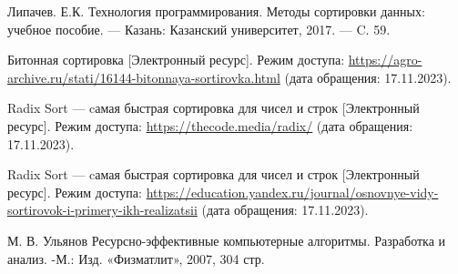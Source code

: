 
\renewcommand\bibname{Список использованных источников}
\begin{thebibliography}{}
	 Липачев. Е.К. Технология программирования. Методы сортировки данных: учебное пособие. — Казань: Казанский университет, 2017. — C. 59.
	
	 Битонная сортировка [Электронный ресурс]. Режим доступа: \url{https://agro-archive.ru/stati/16144-bitonnaya-sortirovka.html} (дата обращения: 17.11.2023).
	
	 Radix Sort  --- cамая быстрая сортировка для чисел и строк [Электронный ресурс]. Режим доступа: \url{https://thecode.media/radix/} (дата обращения: 17.11.2023).
	
	 Radix Sort  --- cамая быстрая сортировка для чисел и строк [Электронный ресурс]. Режим доступа: \url{https://education.yandex.ru/journal/osnovnye-vidy-sortirovok-i-primery-ikh-realizatsii} (дата обращения: 17.11.2023).
	
	  М. В. Ульянов Ресурсно-эффективные компьютерные алгоритмы. Разработка и анализ. -М.: Изд. «Физматлит», 2007, 304 стр.
	
\end{thebibliography}
